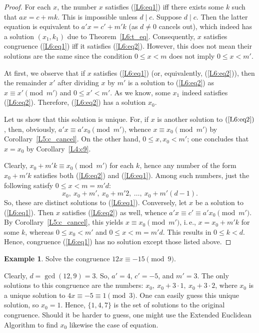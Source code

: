 \documentclass[12pt,notitlepage]{article}
\theoremstyle{plain}
\theoremstyle{definition}
\newtheorem{exm}[thm]{Example}
\theoremstyle{plain}
\newcommand{\1}{\mathbf{1}}
\newcommand{\0}{\mathbf{0}}
\newcommand{\dvd}{\mathop{\mid}}
\begin{document}
\begin{proof}
For each $x$, the number $x$ satisfies (\ref{L6:eq1}) iff there exists some $k$ such that $ax = c + mk$. This is impossible unless $d \dvd c$. Suppose $d \dvd c$. Then the latter equation is equivalent to $a'x = c' + m'k$ (as $d \neq 0$ cancels out), which indeed has a solution $(x_1, k_1)$ due to Theorem~\ref{L6:t_eq}. Consequently, $x$  satisfies congruence (\ref{L6:eq1}) iff it satisfies (\ref{L6:eq2}). However, this does not mean their solutions are the same since the condition $0 \leq x < m$ does not imply $0 \leq x < m'$.

At first, we observe that if $x$ satisfies (\ref{L6:eq1}) (or, equivalently, (\ref{L6:eq2})), then the remainder $x'$ after dividing $x$ by $m'$ is a solution to (\ref{L6:eq2}) as  $x \equiv x' \pmod {m'}$ and $0 \leq x' < m'$. As we know, some $x_1$ indeed satisfies (\ref{L6:eq2}). Therefore, (\ref{L6:eq2}) has a solution $x_0$.

Let us show that this solution is unique. For, if $x$ is another solution to $(\ref{L6:eq2})$, then, obviously, $a'x \equiv a' x_0 \pmod{m'}$, whence $x \equiv x_0 \pmod{m'}$ by Corollary~\ref{L5:c_cancel}. On the other hand, $0 \leq x, x_0 < m'$; one concludes that $x = x_0$ by Corollary~\ref{L4:c9}.

Clearly, $x_0 + m' k \equiv x_0 \pmod {m'}$ for each $k$, hence any number of the form $x_0 + m' k$ satisfies both (\ref{L6:eq2}) and (\ref{L6:eq1}). Among such numbers, just the following satisfy $0 \leq x < m = m'd$:
$$x_0,\ x_0 + m',\ x_0 + m'2,\ \ldots,\ x_0 + m'(d - 1).$$
So, these are distinct solutions to (\ref{L6:eq1}). Conversely, let $x$ be a solution to (\ref{L6:eq1}). Then $x$ satisfies (\ref{L6:eq2}) as well, whence $a' x \equiv c' \equiv a' x_0 \pmod {m'}$. By Corollary~\ref{L5:c_cancel}, this yields $x \equiv x_0 \pmod {m'}$, i.\,e., $x = x_0 + m'k$ for some $k$, whereas $0 \leq x_0 < m'$ and $0 \leq x < m = m'd$. This results in $0 \leq k < d$. Hence, congruence (\ref{L6:eq1}) has no solution except those listed above.
\end{proof}

\begin{exm}
Solve the congruence $12 x \equiv -15 \pmod 9$.

Clearly, $d = \gcd(12, 9) = 3$. So, $a' = 4$, $c' = -5$, and $m' = 3$. The only solutions to this congruence are the numbers:
$x_0,\ x_0 + 3\cdot 1,\ x_0 + 3\cdot 2$,
where $x_0$ is a unique solution to $4 x \equiv -5 \equiv 1 \pmod 3$. One can easily guess this unique solution, so $x_0 = 1$. Hence, $\{1, 4, 7\}$ is the set of solutions to the original congruence. Should it be harder to guess, one might use the Extended Euclidean Algorithm to find $x_0$ likewise the case of equation.
\end{exm}
\end{document}
